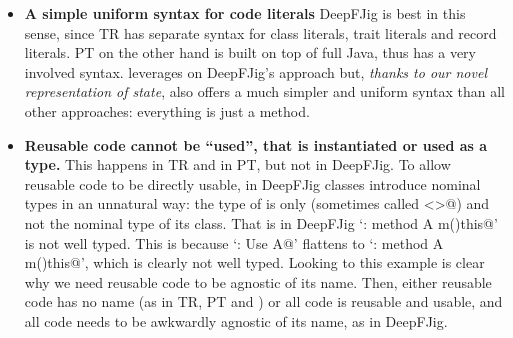 \begin{itemize}
\item {\bf A simple uniform syntax for code literals}
DeepFJig is best in this sense, since TR has separate syntax for class literals, trait literals and record literals.
PT on the other hand is built on top of full Java, thus has a very
involved syntax.
\name leverages on DeepFJig's approach but,
\emph{thanks to our novel representation of state}, \name also offers a much simpler and uniform syntax than
all other approaches: everything is just a method.
\item 
{\bf Reusable code cannot be ``used'', that is instantiated or used as a type.}
This happens in TR and in PT, but not in DeepFJig. To allow reusable code to be directly 
usable, in DeepFJig
classes introduce nominal types in an unnatural way: the type of
\Q@this@ is only \Q@This@ (sometimes called \Q@<>@) and not the
nominal type of its class. 
That is in DeepFJig 
`\Q@A:{ method A m()this}@' is not well typed. This is because
`\Q@B: Use A@' flattens to `\Q@B:{ method A m()this}@', which is clearly not well typed.
Looking to this example is clear why we need reusable code to be agnostic of its name.
Then, either reusable code has no name (as in TR, PT and \name)
or all code is reusable and usable, and all code needs to be awkwardly agnostic of its name, as in DeepFJig.


\end{itemize}
